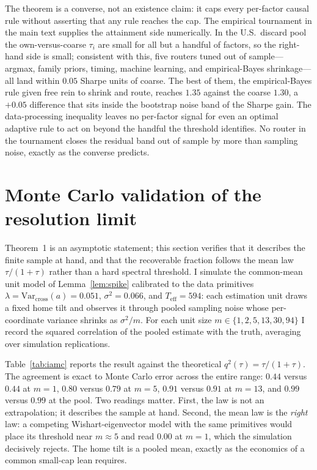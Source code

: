 \documentclass[12pt]{article}
\theoremstyle{plain}
\theoremstyle{definition}
\newcommand{\Var}{\mathrm{Var}}
\begin{document}
\noindent The theorem is a converse, not an existence claim: it caps every
per-factor causal rule without asserting that any rule reaches the cap. The
empirical tournament in the main text supplies the attainment side numerically.
In the U.S.\ discard pool the own-versus-coarse $\tau_i$ are small for all but a
handful of factors, so the right-hand side is small; consistent with this, five
routers tuned out of sample---argmax, family priors, timing, machine learning,
and empirical-Bayes shrinkage---all land within $0.05$ Sharpe units of coarse.
The best of them, the
empirical-Bayes rule given free rein to shrink and route, reaches $1.35$ against
the coarse $1.30$, a $+0.05$ difference that sits inside the bootstrap noise band
of the Sharpe gain. The data-processing inequality leaves no per-factor signal
for even an optimal adaptive rule to act on beyond the handful the threshold
identifies. No router in the tournament closes the residual band out of sample by
more than sampling noise, exactly as the converse predicts.

\section{Monte Carlo validation of the resolution limit}
\label{ia:mc}

Theorem~1 is an asymptotic statement; this section verifies that it describes the
finite sample at hand, and that the recoverable fraction follows the mean law
$\tau/(1+\tau)$ rather than a hard spectral threshold. I simulate the common-mean
unit model of Lemma~\ref{lem:spike} calibrated to the data primitives
$\lambda=\Var_{\text{cross}}(a)=0.051$, $\sigma^2=0.066$, and $T_{\text{eff}}=594$:
each estimation unit draws a fixed home tilt and observes it through pooled
sampling noise whose per-coordinate variance shrinks as $\sigma^2/m$. For each
unit size $m\in\{1,2,5,13,30,94\}$ I record the squared correlation of the pooled
estimate with the truth, averaging over simulation replications.

Table~\ref{tab:iamc} reports the result against the theoretical $q^2(\tau)
=\tau/(1+\tau)$. The agreement is exact to Monte Carlo error across the entire
range: $0.44$ versus $0.44$ at $m=1$, $0.80$ versus $0.79$ at $m=5$, $0.91$
versus $0.91$ at $m=13$, and $0.99$ versus $0.99$ at the pool. Two readings
matter. First, the law is not an extrapolation; it describes the sample at hand.
Second, the mean law is the \emph{right} law: a competing Wishart-eigenvector
model with the same primitives would place its threshold near $m\approx5$ and
read $0.00$ at $m=1$, which the simulation decisively rejects. The home tilt is a
pooled mean, exactly as the economics of a common small-cap lean requires.
\end{document}
